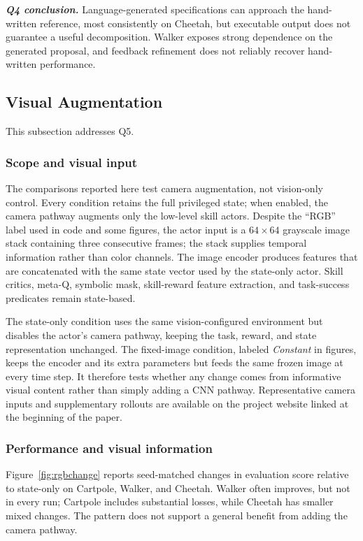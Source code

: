 \documentclass[conference,letterpaper,10pt]{IEEEtran}
\begin{document}
\par\noindent\emph{\textbf{Q4 conclusion.}}
Language-generated specifications can approach the hand-written reference, most consistently on Cheetah, but executable output does not guarantee a useful decomposition. Walker exposes strong dependence on the generated proposal, and feedback refinement does not reliably recover hand-written performance.


\subsection{Visual Augmentation}
This subsection addresses Q5.

\subsubsection{Scope and visual input}
The comparisons reported here test camera augmentation, not vision-only control. Every condition retains the full privileged state; when enabled, the camera pathway augments only the low-level skill actors. Despite the ``RGB'' label used in code and some figures, the actor input is a $64\times64$ grayscale image stack containing three consecutive frames; the stack supplies temporal information rather than color channels. The image encoder produces features that are concatenated with the same state vector used by the state-only actor. Skill critics, meta-Q, symbolic mask, skill-reward feature extraction, and task-success predicates remain state-based.

The state-only condition uses the same vision-configured environment but disables the actor's camera pathway, keeping the task, reward, and state representation unchanged. The fixed-image condition, labeled \emph{Constant} in figures, keeps the encoder and its extra parameters but feeds the same frozen image at every time step. It therefore tests whether any change comes from informative visual content rather than simply adding a CNN pathway. Representative camera inputs and supplementary rollouts are available on the project website linked at the beginning of the paper.

\subsubsection{Performance and visual information}
Figure~\ref{fig:rgbchange} reports seed-matched changes in evaluation score relative to state-only on Cartpole, Walker, and Cheetah. Walker often improves, but not in every run; Cartpole includes substantial losses, while Cheetah has smaller mixed changes. The pattern does not support a general benefit from adding the camera pathway.
\end{document}
